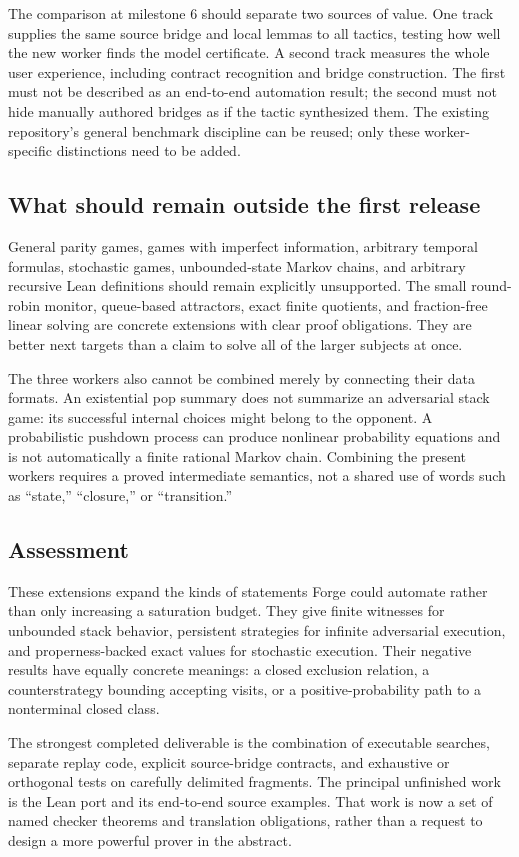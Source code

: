 The comparison at milestone 6 should separate two sources of value. One track
supplies the same source bridge and local lemmas to all tactics, testing how
well the new worker finds the model certificate. A second track measures the
whole user experience, including contract recognition and bridge construction.
The first must not be described as an end-to-end automation result; the second
must not hide manually authored bridges as if the tactic synthesized them.
The existing repository's general benchmark discipline can be reused; only
these worker-specific distinctions need to be added.

\subsection{What should remain outside the first release}
General parity games, games with imperfect information, arbitrary temporal
formulas, stochastic games, unbounded-state Markov chains, and arbitrary
recursive Lean definitions should remain explicitly unsupported. The small
round-robin monitor, queue-based attractors, exact finite quotients, and
fraction-free linear solving are concrete extensions with clear proof
obligations. They are better next targets than a claim to solve all of the
larger subjects at once.

The three workers also cannot be combined merely by connecting their data
formats. An existential pop summary does not summarize an adversarial stack
game: its successful internal choices might belong to the opponent. A
probabilistic pushdown process can produce nonlinear probability equations and
is not automatically a finite rational Markov chain. Combining the present
workers requires a proved intermediate semantics, not a shared use of words
such as ``state,'' ``closure,'' or ``transition.''

\subsection{Assessment}
These extensions expand the kinds of statements Forge could automate rather
than only increasing a saturation budget. They give finite witnesses for
unbounded stack behavior, persistent strategies for infinite adversarial
execution, and properness-backed exact values for stochastic execution. Their
negative results have equally concrete meanings: a closed exclusion relation,
a counterstrategy bounding accepting visits, or a positive-probability path to
a nonterminal closed class.

The strongest completed deliverable is the combination of executable searches,
separate replay code, explicit source-bridge contracts, and exhaustive or
orthogonal tests on carefully delimited fragments. The principal unfinished
work is the Lean port and its end-to-end source examples. That work is now a
set of named checker theorems and translation obligations, rather than a
request to design a more powerful prover in the abstract.
